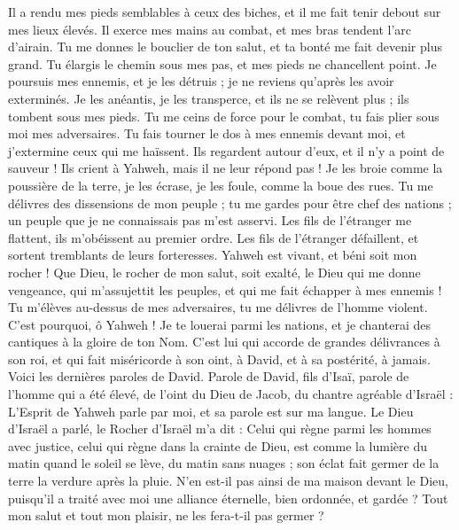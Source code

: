 \begin{multicols}{2}
Il a rendu mes pieds semblables à ceux des biches, et il me fait tenir debout sur mes lieux élevés.
Il exerce mes mains au combat, et mes bras tendent l'arc d'airain.
Tu me donnes le bouclier de ton salut, et ta bonté me fait devenir plus grand.
Tu élargis le chemin sous mes pas, et mes pieds ne chancellent point.
Je poursuis mes ennemis, et je les détruis ; je ne reviens qu'après les avoir exterminés.
Je les anéantis, je les transperce, et ils ne se relèvent plus ; ils tombent sous mes pieds.
Tu me ceins de force pour le combat, tu fais plier sous moi mes adversaires.
Tu fais tourner le dos à mes ennemis devant moi, et j'extermine ceux qui me haïssent.
Ils regardent autour d’eux, et il n’y a point de sauveur ! Ils crient à Yahweh, mais il ne leur répond pas !
Je les broie comme la poussière de la terre, je les écrase, je les foule, comme la boue des rues.
Tu me délivres des dissensions de mon peuple ; tu me gardes pour être chef des nations ; un peuple que je ne connaissais pas m'est asservi.
Les fils de l'étranger me flattent, ils m'obéissent au premier ordre.
Les fils de l'étranger défaillent, et sortent tremblants de leurs forteresses.
Yahweh est vivant, et béni soit mon rocher ! Que Dieu, le rocher de mon salut, soit exalté,
le Dieu qui me donne vengeance, qui m'assujettit les peuples,
et qui me fait échapper à mes ennemis ! Tu m'élèves au-dessus de mes adversaires, tu me délivres de l'homme violent.
C'est pourquoi, ô Yahweh ! Je te louerai parmi les nations, et je chanterai des cantiques à la gloire de ton Nom.
C'est lui qui accorde de grandes délivrances à son roi, et qui fait miséricorde à son oint, à David, et à sa postérité, à jamais.
\VerseOne{}Voici les dernières paroles de David. Parole de David, fils d'Isaï, parole de l'homme qui a été élevé, de l'oint du Dieu de Jacob, du chantre agréable d'Israël :
L'Esprit de Yahweh parle par moi, et sa parole est sur ma langue.
Le Dieu d'Israël a parlé, le Rocher d'Israël m'a dit : Celui qui règne parmi les hommes avec justice, celui qui règne dans la crainte de Dieu,
est comme la lumière du matin quand le soleil se lève, du matin sans nuages ; son éclat fait germer de la terre la verdure après la pluie.
N’en est-il pas ainsi de ma maison devant le Dieu, puisqu'il a traité avec moi une alliance éternelle, bien ordonnée, et gardée ? Tout mon salut et tout mon plaisir, ne les fera-t-il pas germer ?

\end{multicols}
